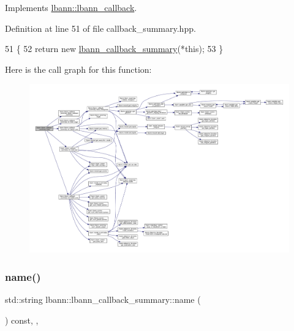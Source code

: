 Implements \hyperlink{classlbann_1_1lbann__callback_a9f545d1269a8c7af335625d049691f26}{lbann\+::lbann\+\_\+callback}.



Definition at line 51 of file callback\+\_\+summary.\+hpp.


\begin{DoxyCode}
51                                                 \{
52     \textcolor{keywordflow}{return} \textcolor{keyword}{new} \hyperlink{classlbann_1_1lbann__callback__summary_aaf405a703a4047cc3c442d0a21a5d208}{lbann\_callback\_summary}(*\textcolor{keyword}{this});
53   \}
\end{DoxyCode}
Here is the call graph for this function\+:\nopagebreak
\begin{figure}[H]
\begin{center}
\leavevmode
\includegraphics[width=350pt]{classlbann_1_1lbann__callback__summary_ae6f1ba60d92f4599361ce5bd5f70caa7_cgraph}
\end{center}
\end{figure}
\mbox{\label{classlbann_1_1lbann__callback__summary_a79814488c1ed0123b335a4cd1a236724}} 
\subsubsection{\texorpdfstring{name()}{name()}}
{\footnotesize\ttfamily std\+::string lbann\+::lbann\+\_\+callback\+\_\+summary\+::name (\begin{DoxyParamCaption}{ }\end{DoxyParamCaption}) const\hspace{0.3cm}{\ttfamily [inline]}, {\ttfamily [override]}, {\ttfamily [virtual]}}

